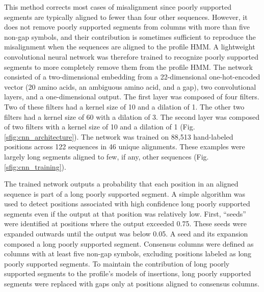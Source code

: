 \documentclass[10pt,letterpaper]{article}
\begin{document}
This method corrects most cases of misalignment since poorly supported segments are typically aligned to fewer than four other sequences. However, it does not remove poorly supported segments from columns with more than five non-gap symbols, and their contribution is sometimes sufficient to reproduce the misalignment when the sequences are aligned to the profile HMM. A lightweight convolutional neural network was therefore trained to recognize poorly supported segments to more completely remove them from the profile HMM. The network consisted of a two-dimensional embedding from a 22-dimensional one-hot-encoded vector (20 amino acids, an ambiguous amino acid, and a gap), two convolutional layers, and a one-dimensional output. The first layer was composed of four filters. Two of these filters had a kernel size of 10 and a dilation of 1. The other two filters had a kernel size of 60 with a dilation of 3. The second layer was composed of two filters with a kernel size of 10 and a dilation of 1 (Fig. \ref{sfig:cnn_architecture}). The network was trained on 88,513 hand-labeled positions across 122 sequences in 46 unique alignments. These examples were largely long segments aligned to few, if any, other sequences (Fig. \ref{sfig:cnn_training}).

The trained network outputs a probability that each position in an aligned sequence is part of a long poorly supported segment. A simple algorithm was used to detect positions associated with high confidence long poorly supported segments even if the output at that position was relatively low. First, “seeds” were identified at positions where the output exceeded 0.75. These seeds were expanded outwards until the output was below 0.05. A seed and its expansion composed a long poorly supported segment. Consensus columns were defined as columns with at least five non-gap symbols, excluding positions labeled as long poorly supported segments. To maintain the contribution of long poorly supported segments to the profile’s models of insertions, long poorly supported segments were replaced with gaps only at positions aligned to consensus columns.
\end{document}
